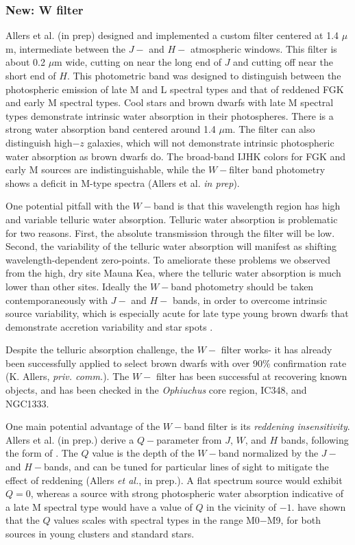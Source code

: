 \subsubsection{New: W filter}
Allers et al. (in prep) designed and implemented a custom filter centered at 1.4 $\mu$m, intermediate between the $J-$ and $H-$ atmospheric windows.  This filter is about 0.2 $\mu$m wide, cutting on near the long end of $J$ and cutting off near the short end of $H$.  This photometric band was designed to distinguish between the photospheric emission of late M and L spectral types and that of reddened FGK and early M spectral types.  Cool stars and brown dwarfs with late M spectral types demonstrate intrinsic water absorption in their photospheres.  There is a strong water absorption band centered around 1.4 $\mu$m.  The filter can also distinguish high$-z$ galaxies, which will not demonstrate intrinsic photospheric water absorption as brown dwarfs do.  The broad-band IJHK colors for FGK and early M sources are indistinguishable, while the $W-$filter band photometry shows a deficit in M-type spectra (Allers et al. \emph{in prep}).

One potential pitfall with the $W-$band is that this wavelength region has high and variable telluric water absorption.  Telluric water absorption is problematic for two reasons.  First, the absolute transmission through the filter will be low.  Second, the variability of the telluric water absorption will manifest as shifting wavelength-dependent zero-points. To ameliorate these problems we observed from the high, dry site Mauna Kea, where the telluric water absorption is much lower than other sites.  Ideally the $W-$band photometry should be taken contemporaneously with $J-$ and $H-$ bands, in order to overcome intrinsic source variability, which is especially acute for late type young brown dwarfs that demonstrate accretion variability and star spots \citep{2008A&A...485..155A,2014AJ....147...82C}.

Despite the telluric absorption challenge, the $W-$ filter works- it has already been successfully applied to select brown dwarfs with over 90\% confirmation rate (K. Allers, \emph{priv. comm.}).  The $W-$ filter has been successful at recovering known objects, and has been checked in the \emph{Ophiuchus} core region, IC348, and NGC1333.

One main potential advantage of the $W-$band filter is its \emph{reddening insensitivity}.  Allers et al. (in prep.) derive a $Q-$parameter from $J$, $W$, and $H$ bands, following the form of \citet{2000ApJ...541..977N}.  The $Q$ value is the depth of the $W-$band normalized by the $J-$ and $H-$bands, and can be tuned for particular lines of sight to mitigate the effect of reddening (Allers \emph{et al.}, in prep.).  A flat spectrum source would exhibit $Q=0$, whereas a source with strong photospheric water absorption indicative of a late M spectral type would have a value of $Q$ in the vicinity of $-1$.  \citet{2000ApJ...541..977N} have shown that the $Q$ values scales with spectral types in the range M0$-$M9, for both sources in young clusters and standard stars.  

